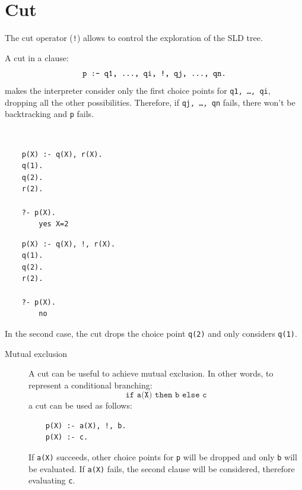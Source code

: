 \section{Cut}

The cut operator (\texttt{!}) allows to control the exploration of the SLD tree.

A cut in a clause:
\[ \texttt{p :- q1, \dots, qi, !, qj, \dots, qn.} \]
makes the interpreter consider only the first choice points for \texttt{q1, \dots, qi}, dropping all the other possibilities.
Therefore, if \texttt{qj, \dots, qn} fails, there won't be backtracking and \texttt{p} fails.

\begin{example} \phantom{}\\[0.5em]
    \begin{minipage}{0.5\textwidth}
        \begin{lstlisting}
    p(X) :- q(X), r(X).
    q(1).
    q(2).
    r(2).

    ?- p(X).
        yes X=2
        \end{lstlisting}
    \end{minipage}
    \begin{minipage}{0.5\textwidth}
        \begin{lstlisting}
    p(X) :- q(X), !, r(X).
    q(1).
    q(2).
    r(2).

    ?- p(X).
        no
        \end{lstlisting}
    \end{minipage}

    In the second case, the cut drops the choice point \texttt{q(2)} and only considers \texttt{q(1)}.
\end{example}

\begin{description}
    \item[Mutual exclusion]
        A cut can be useful to achieve mutual exclusion.
        In other words, to represent a conditional branching:
        \[ \texttt{if a(X) then b else c} \]
        a cut can be used as follows:
        \begin{lstlisting}
    p(X) :- a(X), !, b.
    p(X) :- c.
        \end{lstlisting}

        If \texttt{a(X)} succeeds, other choice points for \texttt{p} will be dropped and only \texttt{b} will be evaluated.
        If \texttt{a(X)} fails, the second clause will be considered, therefore evaluating \texttt{c}.
\end{description}



